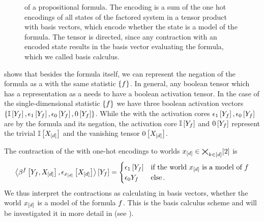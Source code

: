 \begin{figure}[t]
    \begin{center}
        
    \end{center}
    \caption{\BasisEncoding{} of a propositional formula.
    The encoding is a sum of the one hot encodings of all states of the factored system in a tensor product with basis vectors, which encode whether the state is a model of the formula.
    The tensor is directed, since any contraction with an encoded state results in the basis vector evaluating the formula, which we called basis calculus.
    }
    \label{fig:formulabencoding}
\end{figure}

 shows that besides the formula itself, we can represent the negation of the formula as a \ComputationActivationNetwork{} with the same statistic $\{f\}$.
In general, any boolean tensor which has a representation as a \ComputationActivationNetwork{} needs to have a boolean activation tensor.
In the case of the single-dimensional statistic $\{f\}$ we have three boolean activation vectors $\{\mathbb{I}\left[Y_{f}\right],\epsilon_{1}\left[Y_{f}\right],\epsilon_{0}\left[Y_{f}\right],0\left[Y_{f}\right]\}$.
While the \ComputationActivationNetworks{} with the activation cores $\epsilon_{1}\left[Y_{f}\right],\epsilon_{0}\left[Y_{f}\right]$ are by  the formula and its negation, the activation core $\mathbb{I}\left[Y_{f}\right]$ and $0\left[Y_{f}\right]$ represent the trivial $\mathbb{I}\left[X_{[d]}\right]$ and the vanishing tensor $0\left[X_{[d]}\right]$.

The contraction of the \basisEncoding{} with one-hot encodings to worlds $x_{[d]}\in\bigtimes_{k\in[d]}[2]$ is
\begin{align*}
    \left\langle \beta^{f}\left[Y_{f},X_{[d]}\right],\epsilon_{x_{[d]}}\left[X_{[d]}\right]\right\rangle \left[ Y_{f} \right]
    = \begin{cases}
          \epsilon_{1}\left[Y_{f}\right] & \text{if the world $x_{[d]}$ is a model of $f$}  \\
          \epsilon_{0}{Y_{f}} & \text{else} \, .
    \end{cases}
\end{align*}
We thus interpret the contractions as calculating in basis vectors, whether the world $x_{[d]}$ is a model of the formula $f$.
This is the basis calculus scheme and will be investigated it in more detail in  (see ).


